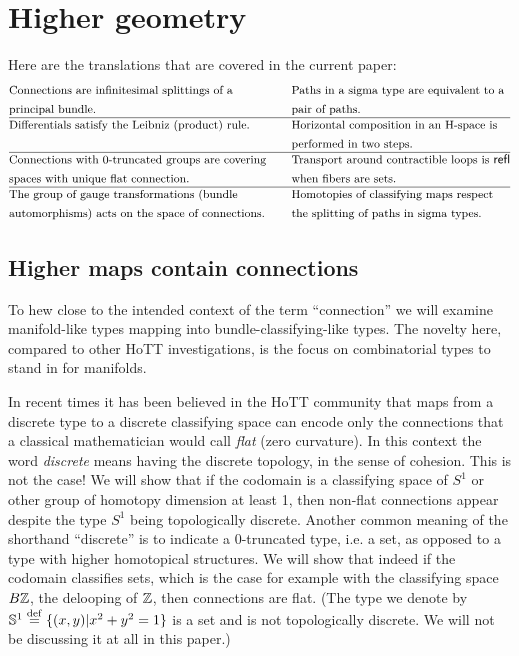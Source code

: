 \section{Higher geometry}

Here are the translations that are covered in the current paper:
\begin{align*}
& \text{\small Connections are infinitesimal splittings of a} & \quad &\text{\small Paths in a sigma type are equivalent to a}        \\
& \text{\small principal bundle.} & \quad&\text{\small pair of paths.}        \\ \hline
& \text{\small Differentials satisfy the Leibniz (product) rule.} &\quad  &\text{\small Horizontal composition in an H-space is} \\ 
&  &  \quad&\text{\small performed in two steps.} \\ \hline
& \text{\small Connections with 0-truncated groups are covering}        &\quad &\text{\small Transport around contractible loops is } \mathsf{refl}             \\ 
& \text{\small spaces with unique flat connection.}        & \quad&\text{\small when fibers are sets.}             \\ \hline
& \text{\small The group of gauge transformations (bundle} &\quad &\text{\small Homotopies of classifying maps respect } \\ 
& \text{\small automorphisms) acts on the space of connections.} & \quad&\text{\small the splitting of paths in sigma types.} \\ 
\end{align*}

\subsection{Higher maps contain connections}

To hew close to the intended context of the term ``connection'' we will examine manifold-like types mapping into bundle-classifying-like types. The novelty here, compared to other HoTT investigations, is the focus on combinatorial types to stand in for manifolds.

In recent times it has been believed in the HoTT community that maps from a discrete type to a discrete classifying space can encode only the connections that a classical mathematician would call \emph{flat} (zero curvature). In this context the word \emph{discrete} means having the discrete topology, in the sense of cohesion\cite{shulman_cohesion}. This is not the case! We will show that if the codomain is a classifying space of \( S^1 \) or other group of homotopy dimension at least 1, then non-flat connections appear despite the type \( S^1 \) being topologically discrete. Another common meaning of the shorthand ``discrete'' is to indicate a 0-truncated type, i.e. a set, as opposed to a type with higher homotopical structures. We will show that indeed if the codomain classifies sets, which is the case for example with the classifying space \( B\mathbb{Z} \), the delooping of \( \mathbb{Z} \), then connections are flat. (The type we denote by \( \mathbb{S}^1\stackrel{\mathrm{def}}{=}\{(x, y)|x^2+y^2=1\} \) is a set and is not topologically discrete. We will not be discussing it at all in this paper.)

